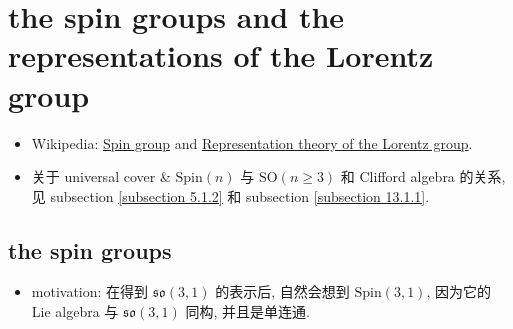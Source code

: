 \chapter{the spin groups and the representations of the Lorentz group}
\begin{itemize}
	\item Wikipedia: \href{https://en.wikipedia.org/wiki/Spin_group}{Spin group} and \href{https://en.wikipedia.org/wiki/Representation_theory_of_the_Lorentz_group}{Representation theory of the Lorentz group}.
	
	\item 关于 universal cover \& $\mathrm{Spin}(n)$ 与 $\mathrm{SO}(n \geq 3)$ 和 Clifford algebra 的关系, 见 subsection \ref{subsection 5.1.2} 和 subsection \ref{subsection 13.1.1}.
\end{itemize}

\section{the spin groups}
\begin{itemize}
	\item motivation: 在得到 $\mathfrak{so}(3, 1)$ 的表示后, 自然会想到 $\mathrm{Spin}(3, 1)$, 因为它的 Lie algebra 与 $\mathfrak{so}(3, 1)$ 同构, 并且是单连通.
\end{itemize}
